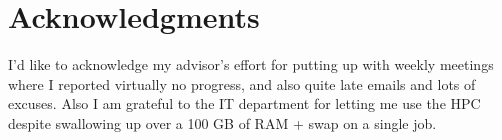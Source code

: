 \section*{Acknowledgments}\label{section:acknowledgments}
\pagestyle{plain}

I'd like to acknowledge my advisor's effort for putting up with weekly
meetings where I reported virtually no progress, and also quite late emails
and lots of excuses.
Also I am grateful to the IT department for letting me use the HPC
despite swallowing up over a 100 GB of RAM + swap on a single job.
